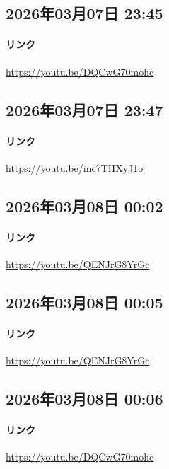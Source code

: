 \subsection*{2026年03月07日 23:45}

\paragraph{リンク}
\url{https://youtu.be/DQCwG70mohc}

\subsection*{2026年03月07日 23:47}

\paragraph{リンク}
\url{https://youtu.be/inc7THXyJ1o}

\subsection*{2026年03月08日 00:02}

\paragraph{リンク}
\url{https://youtu.be/QENJrG8YrGc}

\subsection*{2026年03月08日 00:05}

\paragraph{リンク}
\url{https://youtu.be/QENJrG8YrGc}

\subsection*{2026年03月08日 00:06}

\paragraph{リンク}
\url{https://youtu.be/DQCwG70mohc}

